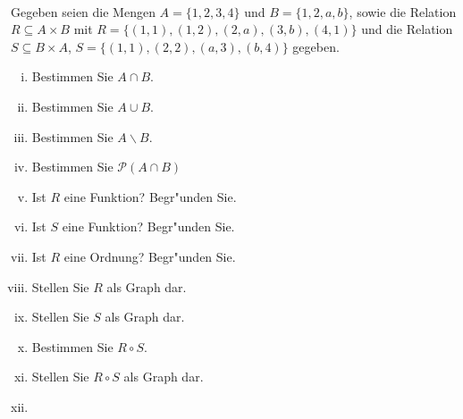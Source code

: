 \newcommand{\printpraesenzlsg}{false}
\newcommand{\printloesungen}{true}
\newcommand{\printbewertungen}{false}
\newcommand{\blattnummer}{1}




\iforiginal{}
\\
Gegeben seien die Mengen $A=\{1,2,3,4\}$ und $B=\{1,2,a,b\}$, sowie die Relation $R\subseteq A\times B$ mit $R=\{(1,1),(1,2),(2,a),(3,b),(4,1)\}$ und die Relation 
$S\subseteq B\times A$, $S=\{(1,1),(2,2),(a,3),(b,4)\}$ gegeben.
\begin{enumerate}[(i)]
    \item Bestimmen Sie $A\cap B$.
    \item Bestimmen Sie $A\cup B$.
    \item Bestimmen Sie $A\backslash B$.
    \item Bestimmen Sie $\mathscr{P}(A\cap B)$
    \item Ist $R$ eine Funktion? Begr"unden Sie.
    \item Ist $S$ eine Funktion? Begr"unden Sie.
    \item Ist $R$ eine Ordnung? Begr"unden Sie.
    \item Stellen Sie $R$ als Graph dar.
    \item Stellen Sie $S$ als Graph dar.
    \item Bestimmen Sie $R\circ S$.
    \item Stellen Sie $R\circ S$ als Graph dar.
    \item 
\end{enumerate}
